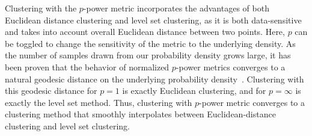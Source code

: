   Clustering with the $p$-power metric incorporates the
  advantages of both Euclidean distance clustering and level set
  clustering, as it is both data-sensitive and takes into account
  overall
  Euclidean distance between two points.
  Here, $p$ can be toggled to change the sensitivity of the metric
  to the underlying density.
  As the number of samples
  drawn from our probability density grows large, it has been proven that the behavior of
  normalized $p$-power metrics converges to a natural geodesic distance on the
  underlying probability density~\cite{hwang2016}. Clustering with
  this geodesic distance for $p=1$ is exactly Euclidean clustering, and for
  $p=\infty$ is exactly the level set method. 
   Thus, clustering with $p$-power metric converges to
  a clustering method that smoothly interpolates between
  Euclidean-distance clustering and level set clustering. 

